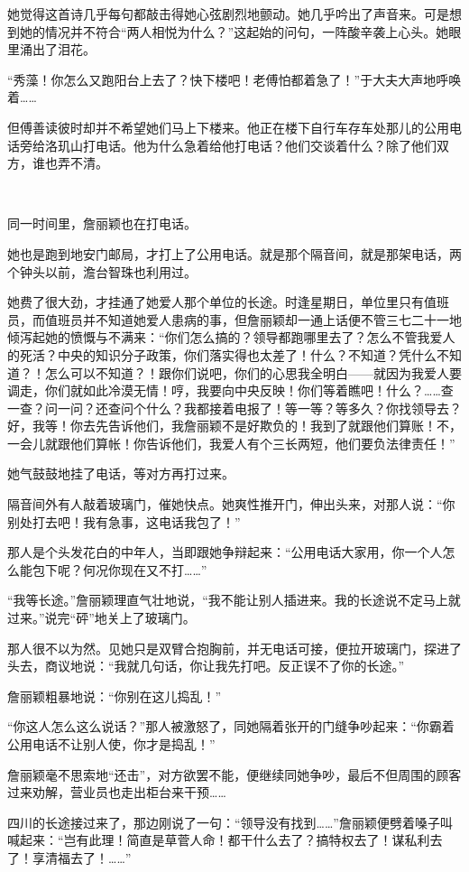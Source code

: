 \par 她觉得这首诗几乎每句都敲击得她心弦剧烈地颤动。她几乎吟出了声音来。可是想到她的情况并不符合“两人相悦为什么？”这起始的问句，一阵酸辛袭上心头。她眼里涌出了泪花。
\par “秀藻！你怎么又跑阳台上去了？快下楼吧！老傅怕都着急了！”于大夫大声地呼唤着……
\par 但傅善读彼时却并不希望她们马上下楼来。他正在楼下自行车存车处那儿的公用电话旁给洛玑山打电话。他为什么急着给他打电话？他们交谈着什么？除了他们双方，谁也弄不清。
\par  
\par 同一时间里，詹丽颖也在打电话。
\par 她也是跑到地安门邮局，才打上了公用电话。就是那个隔音间，就是那架电话，两个钟头以前，澹台智珠也利用过。
\par 她费了很大劲，才挂通了她爱人那个单位的长途。时逢星期日，单位里只有值班员，而值班员并不知道她爱人患病的事，但詹丽颖却一通上话便不管三七二十一地倾泻起她的愤慨与不满来：“你们怎么搞的？领导都跑哪里去了？怎么不管我爱人的死活？中央的知识分子政策，你们落实得也太差了！什么？不知道？凭什么不知道？！怎么可以不知道？！跟你们说吧，你们的心思我全明白——就因为我爱人要调走，你们就如此冷漠无情！哼，我要向中央反映！你们等着瞧吧！什么？……查一查？问一问？还查问个什么？我都接着电报了！等一等？等多久？你找领导去？好，我等！你去先告诉他们，我詹丽颖不是好欺负的！我到了就跟他们算账！不，一会儿就跟他们算帐！你告诉他们，我爱人有个三长两短，他们要负法律责任！”
\par 她气鼓鼓地挂了电话，等对方再打过来。
\par 隔音间外有人敲着玻璃门，催她快点。她爽性推开门，伸出头来，对那人说：“你别处打去吧！我有急事，这电话我包了！”
\par 那人是个头发花白的中年人，当即跟她争辩起来：“公用电话大家用，你一个人怎么能包下呢？何况你现在又不打……”
\par “我等长途。”詹丽颖理直气壮地说，“我不能让别人插进来。我的长途说不定马上就过来。”说完“砰”地关上了玻璃门。
\par 那人很不以为然。见她只是双臂合抱胸前，并无电话可接，便拉开玻璃门，探进了头去，商议地说：“我就几句话，你让我先打吧。反正误不了你的长途。”
\par 詹丽颖粗暴地说：“你别在这儿捣乱！”
\par “你这人怎么这么说话？”那人被激怒了，同她隔着张开的门缝争吵起来：“你霸着公用电话不让别人使，你才是捣乱！”
\par 詹丽颖毫不思索地“还击”，对方欲罢不能，便继续同她争吵，最后不但周围的顾客过来劝解，营业员也走出柜台来干预……
\par 四川的长途接过来了，那边刚说了一句：“领导没有找到……”詹丽颖便劈着嗓子叫喊起来：“岂有此理！简直是草菅人命！都干什么去了？搞特权去了！谋私利去了！享清福去了！……”
